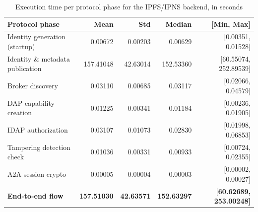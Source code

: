 \begin{table}[htb]
\centering
\caption{Execution time per protocol phase for the IPFS/IPNS backend, in seconds}
\label{tab:phase-latency-ipfs}
\begin{tabular}{lrrrr}
\toprule
\textbf{Protocol phase} & \textbf{Mean} & \textbf{Std} & \textbf{Median} & \textbf{[Min, Max]} \\
\midrule
Identity generation (startup)      & 0.00672 & 0.00203 & 0.00629 & [0.00351, 0.01528] \\
Identity \& metadata publication   & 157.41048 & 42.63014 & 152.53360 & [60.55074, 252.89539] \\
Broker discovery                   & 0.03110 & 0.00685 & 0.03117 & [0.02066, 0.04579] \\
DAP capability creation            & 0.01225 & 0.00341 & 0.01184 & [0.00236, 0.01905] \\
IDAP authorization                 & 0.03107 & 0.01073 & 0.02830 & [0.01998, 0.06853] \\
Tampering detection check          & 0.01036 & 0.00331 & 0.00933 & [0.00724, 0.02355] \\
A2A session crypto                 & 0.00005 & 0.00004 & 0.00003 & [0.00002, 0.00027] \\
\midrule
\textbf{End-to-end flow} & \textbf{157.51030} & \textbf{42.63571} & \textbf{152.63297} & \textbf{[60.62689, 253.00248]} \\
\bottomrule
\end{tabular}
\end{table}

